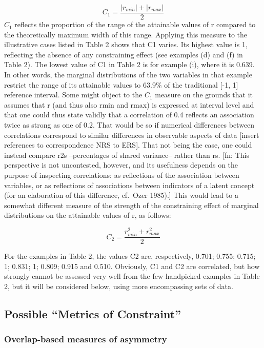\documentclass[
  12pt,
]{article}
\theoremstyle{plain}
\theoremstyle{definition}
\theoremstyle{remark}
\begin{document}
\[
C_1 = \frac{|r_{min}| +|r_{max}|}{2}
\] \(C_1\) reflects the proportion of the range of the attainable values
of r compared to the theoretically maximum width of this range. Applying
this measure to the illustrative cases listed in Table 2 shows that C1
varies. Its highest value is 1, reflecting the absence of any
constraining effect (see examples (d) and (f) in Table 2). The lowest
value of C1 in Table 2 is for example (i), where it is 0.639. In other
words, the marginal distributions of the two variables in that example
restrict the range of its attainable values to 63.9\% of the traditional
{[}-1, 1{]} reference interval. Some might object to the \(C_1\) measure
on the grounds that it assumes that r (and thus also rmin and rmax) is
expressed at interval level and that one could thus state validly that a
correlation of 0.4 reflects an association twice as strong as one of
0.2. That would be so if numerical differences between correlations
correspond to similar differences in observable aspects of data
{[}insert references to correspondence NRS to ERS{]}. That not being the
case, one could instead compare r2s --percentages of shared variance--
rather than rs. {[}fn: This perspective is not uncontested, however, and
its usefulness depends on the purpose of inspecting correlations: as
reflections of the association between variables, or as reflections of
associations between indicators of a latent concept (for an elaboration
of this difference, cf.~Ozer 1985).{]} This would lead to a somewhat
different measure of the strength of the constraining effect of marginal
distributions on the attainable values of r, as follows:

\[
C_2 = \frac{r_{min}^2 +r_{max}^2}{2}
\]

For the examples in Table 2, the values C2 are, respectively, 0.701;
0.755; 0.715; 1; 0.831; 1; 0.809; 0.915 and 0.510. Obviously, C1 and C2
are correlated, but how strongly cannot be assessed very well from the
few handpicked examples in Table 2, but it will be considered below,
using more encompassing sets of data.

\subsection{Possible ``Metrics of
Constraint''}\label{possible-metrics-of-constraint}

\subsubsection{Overlap-based measures of
asymmetry}\label{overlap-based-measures-of-asymmetry}
\end{document}

